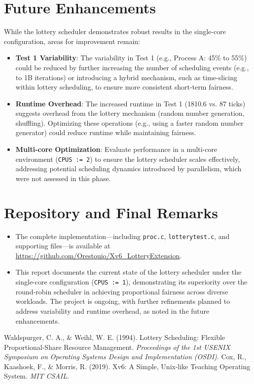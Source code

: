 \documentclass{article}
\begin{document}
\section{Future Enhancements}
While the lottery scheduler demonstrates robust results in the single-core configuration, areas for improvement remain:

\begin{itemize}
    \item \textbf{Test 1 Variability}: The variability in Test 1 (e.g., Process A: 45\% to 55\%) could be reduced by further increasing the number of scheduling events (e.g., to 1B iterations) or introducing a hybrid mechanism, such as time-slicing within lottery scheduling, to ensure more consistent short-term fairness.
    \item \textbf{Runtime Overhead}: The increased runtime in Test 1 (1810.6 vs. 87 ticks) suggests overhead from the lottery mechanism (random number generation, shuffling). Optimizing these operations (e.g., using a faster random number generator) could reduce runtime while maintaining fairness.
    \item \textbf{Multi-core Optimization}: Evaluate performance in a multi-core environment (\texttt{CPUS := 2}) to ensure the lottery scheduler scales effectively, addressing potential scheduling dynamics introduced by parallelism, which were not assessed in this phase.
\end{itemize}

\section{Repository and Final Remarks}
\begin{itemize}
    \item The complete implementation—including \texttt{proc.c}, \texttt{lotterytest.c}, and supporting files—is available at \url{https://github.com/Orestouio/Xv6_LotteryExtension}.
    \item This report documents the current state of the lottery scheduler under the single-core configuration (\texttt{CPUS := 1}), demonstrating its superiority over the round-robin scheduler in achieving proportional fairness across diverse workloads. The project is ongoing, with further refinements planned to address variability and runtime overhead, as noted in the future enhancements.
\end{itemize}

\begin{thebibliography}{9}
Waldspurger, C. A., \& Weihl, W. E. (1994). Lottery Scheduling: Flexible Proportional-Share Resource Management. \textit{Proceedings of the 1st USENIX Symposium on Operating Systems Design and Implementation (OSDI)}.
Cox, R., Kaashoek, F., \& Morris, R. (2019). Xv6: A Simple, Unix-like Teaching Operating System. \textit{MIT CSAIL}.
\end{thebibliography}
\end{document}
